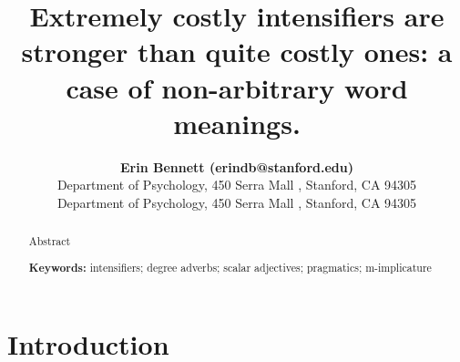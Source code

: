 \documentclass[10pt,letterpaper]{article}
\title{Extremely costly intensifiers are stronger than quite costly ones: a case of non-arbitrary word meanings.}
\author{{\large \bf Erin Bennett (erindb@stanford.edu)} \\
  Department of Psychology, 450 Serra Mall , Stanford, CA 94305
  \AND {\large \bf Noah Goodman (ngoodman@stanford.edu)} \\
  Department of Psychology, 450 Serra Mall , Stanford, CA 94305}
\newcommand{\todo}[1]{{\color{red}#1}}
\begin{document}
\maketitle

\begin{abstract}

\todo{Abstract}

\textbf{Keywords:} 
intensifiers; degree adverbs; scalar adjectives; pragmatics; m-implicature
\end{abstract}

\section{Introduction}


\end{document}
